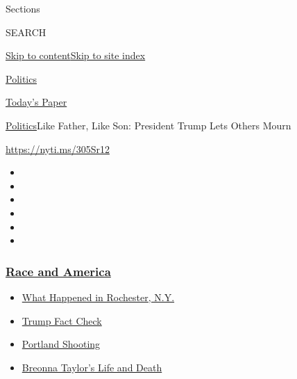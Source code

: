Sections

SEARCH

\protect\hyperlink{site-content}{Skip to
content}\protect\hyperlink{site-index}{Skip to site index}

\href{https://www.nytimes3xbfgragh.onion/section/politics}{Politics}

\href{https://myaccount.nytimes3xbfgragh.onion/auth/login?response_type=cookie\&client_id=vi}{}

\href{https://www.nytimes3xbfgragh.onion/section/todayspaper}{Today's
Paper}

\href{/section/politics}{Politics}\textbar{}Like Father, Like Son:
President Trump Lets Others Mourn

\url{https://nyti.ms/305Sr12}

\begin{itemize}
\item
\item
\item
\item
\item
\item
\end{itemize}

\hypertarget{race-and-america}{%
\subsubsection{\texorpdfstring{\href{https://www.nytimes3xbfgragh.onion/news-event/george-floyd-protests-minneapolis-new-york-los-angeles?name=styln-george-floyd\&region=TOP_BANNER\&block=storyline_menu_recirc\&action=click\&pgtype=Article\&impression_id=f8912760-f296-11ea-93a2-8f7a571e9dcf\&variant=undefined}{Race
and America}}{Race and America}}\label{race-and-america}}

\begin{itemize}
\tightlist
\item
  \href{https://www.nytimes3xbfgragh.onion/2020/09/04/nyregion/rochester-police-daniel-prude.html?name=styln-george-floyd\&region=TOP_BANNER\&block=storyline_menu_recirc\&action=click\&pgtype=Article\&impression_id=f8912761-f296-11ea-93a2-8f7a571e9dcf\&variant=undefined}{What
  Happened in Rochester, N.Y.}
\item
  \href{https://www.nytimes3xbfgragh.onion/2020/09/01/us/politics/trump-fact-check-protests.html?name=styln-george-floyd\&region=TOP_BANNER\&block=storyline_menu_recirc\&action=click\&pgtype=Article\&impression_id=f8914e70-f296-11ea-93a2-8f7a571e9dcf\&variant=undefined}{Trump
  Fact Check}
\item
  \href{https://www.nytimes3xbfgragh.onion/2020/08/30/us/portland-shooting-explained.html?name=styln-george-floyd\&region=TOP_BANNER\&block=storyline_menu_recirc\&action=click\&pgtype=Article\&impression_id=f8914e71-f296-11ea-93a2-8f7a571e9dcf\&variant=undefined}{Portland
  Shooting}
\item
  \href{https://www.nytimes3xbfgragh.onion/2020/08/30/us/breonna-taylor-police-killing.html?name=styln-george-floyd\&region=TOP_BANNER\&block=storyline_menu_recirc\&action=click\&pgtype=Article\&impression_id=f8914e72-f296-11ea-93a2-8f7a571e9dcf\&variant=undefined}{Breonna
  Taylor's Life and Death}
\end{itemize}

